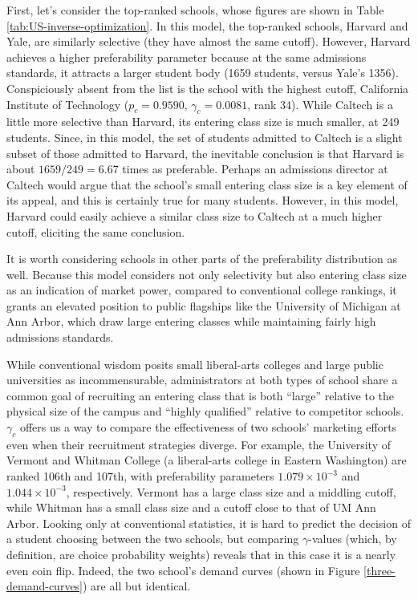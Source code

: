 \documentclass[12pt]{article}
\theoremstyle{definition}
\begin{document}
First, let's consider the top-ranked schools, whose figures are shown in Table \ref{tab:US-inverse-optimization}. In this model, the top-ranked schools, Harvard and Yale, are similarly selective (they have almost the same cutoff). However, Harvard achieves a higher preferability parameter because at the same admissions standards, it attracts a larger student body (1659 students, versus Yale's 1356). Conspiciously absent from the list is the school with the highest cutoff, California Institute of Technology ($p_c = 0.9590$, $\gamma_c = 0.0081$, rank 34). While Caltech is a little more selective than Harvard, its entering class size is much smaller, at 249 students. Since, in this model, the set of students admitted to Caltech is a slight subset of those admitted to Harvard, the inevitable conclusion is that Harvard is about $1659 / 249 = 6.67$ times as preferable. Perhaps an admissions director at Caltech would argue that the school's small entering class size is a key element of its appeal, and this is certainly true for many students. However, in this model, Harvard could easily achieve a similar class size to Caltech at a much higher cutoff, eliciting the same conclusion.

It is worth considering schools in other parts of the preferability distribution as well. Because this model considers not only selectivity but also entering class size as an indication of market power, compared to conventional college rankings, it grants an elevated position to public flagships like the University of Michigan at Ann Arbor, which draw large entering classes while maintaining fairly high admissions standards.

While conventional wisdom posits small liberal-arts colleges and large public universities as incommensurable, administrators at both types of school share a common goal of recruiting an entering class that is both ``large'' relative to the physical size of the campus and ``highly qualified'' relative to competitor schools. $\gamma_c$ offers us a way to compare the effectiveness of two schools' marketing efforts even when their recruitment strategies diverge. For example, the University of Vermont and Whitman College (a liberal-arts college in Eastern Washington) are ranked 106th and 107th, with preferability parameters $1.079 \times 10^{-3}$ and $1.044 \times 10^{-3}$, respectively. Vermont has a large class size and a middling cutoff, while Whitman has a small class size and a cutoff close to that of UM Ann Arbor. Looking only at conventional statistics, it is hard to predict the decision of a student choosing between the two schools, but comparing $\gamma$-values (which, by definition, are choice probability weights) reveals that in this case it is a nearly even coin flip. Indeed, the two school's demand curves (shown in Figure \ref{three-demand-curves}) are all but identical. 
\end{document}
